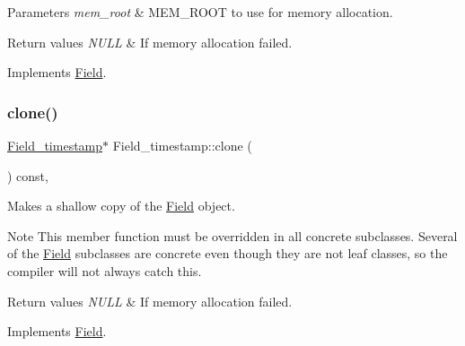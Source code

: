 \begin{DoxyParams}{Parameters}
{\em mem\+\_\+root} & M\+E\+M\+\_\+\+R\+O\+OT to use for memory allocation. \\
\hline
\end{DoxyParams}

\begin{DoxyRetVals}{Return values}
{\em N\+U\+LL} & If memory allocation failed. \\
\hline
\end{DoxyRetVals}


Implements \mbox{\hyperlink{classField_a64979bcb9345803b031fff76a0c3d9fe}{Field}}.

\mbox{\label{classField__timestamp_ac47d953c0101691f25ed684c08738272}} 
\subsubsection{\texorpdfstring{clone()}{clone()}\hspace{0.1cm}{\footnotesize\ttfamily [2/2]}}
{\footnotesize\ttfamily \mbox{\hyperlink{classField__timestamp}{Field\+\_\+timestamp}}$\ast$ Field\+\_\+timestamp\+::clone (\begin{DoxyParamCaption}{ }\end{DoxyParamCaption}) const\hspace{0.3cm}{\ttfamily [inline]}, {\ttfamily [virtual]}}

Makes a shallow copy of the \mbox{\hyperlink{classField}{Field}} object.

\begin{DoxyNote}{Note}
This member function must be overridden in all concrete subclasses. Several of the \mbox{\hyperlink{classField}{Field}} subclasses are concrete even though they are not leaf classes, so the compiler will not always catch this.
\end{DoxyNote}

\begin{DoxyRetVals}{Return values}
{\em N\+U\+LL} & If memory allocation failed. \\
\hline
\end{DoxyRetVals}


Implements \mbox{\hyperlink{classField_a01a9a9aa3a618941e839b1b8793c969d}{Field}}.

\mbox{\label{classField__timestamp_ac94ca4c1709650bf64c38089bfbf4aaa}} 
